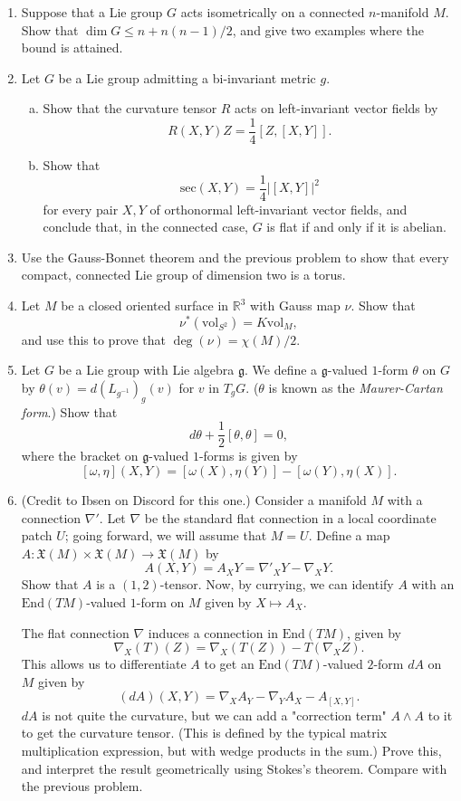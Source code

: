\documentclass[11pt]{article} %
\begin{document}
\begin{enumerate}
	\item Suppose that a Lie group $G$ acts isometrically on a connected $n$-manifold $M$. Show that $\dim G \leq n + n(n - 1)/2$, and give two examples where the bound is attained.

	\item Let $G$ be a Lie group admitting a bi-invariant metric $g$. 
	\begin{enumerate}[(a)]
		\item Show that the curvature tensor $R$ acts on left-invariant vector fields by 
		\[
			R(X, Y)Z = \frac{1}{4}[Z,[X,Y]].
		\]

		\item Show that 
		\[
			\mathrm{sec}(X, Y) = \frac{1}{4}\left|[X,Y]\right|^2
		\]
		for every pair $X,Y$ of orthonormal left-invariant vector fields, and conclude that, in the connected case, $G$ is flat if and only if it is abelian.
	\end{enumerate}
	
	\item Use the Gauss-Bonnet theorem and the previous problem to show that every compact, connected Lie group of dimension two is a torus.

	\item Let $M$ be a closed oriented surface in $\mathbb{R}^3$ with Gauss map $\nu$. Show that
	\[
		\nu^*(\mathrm{vol}_{S^2}) = K \mathrm{vol}_M, 
	\]
	and use this to prove that $\deg(\nu) = \chi(M)/2$.

	\item Let $G$ be a Lie group with Lie algebra $\mathfrak{g}$. We define a $\mathfrak{g}$-valued $1$-form $\theta$ on $G$ by $\theta(v) = d(L_{g^{-1}})_g(v)$ for $v$ in $T_gG$. ($\theta$ is known as the \emph{Maurer-Cartan form}.) Show that 
	\[
		d\theta + \frac{1}{2} [\theta, \theta] = 0,
	\]
	where the bracket on $\mathfrak{g}$-valued $1$-forms is given by 
	\[
			[\omega,\eta](X, Y) = [\omega(X),\eta(Y)] - [\omega(Y), \eta(X)].
	\]
	\item (Credit to Ibsen on Discord for this one.) Consider a manifold $M$ with a connection $\nabla'$. Let $\nabla$ be the standard flat connection in a local coordinate patch $U$; going forward, we will assume that $M = U$. Define a map $A\colon \mathfrak{X}(M) \times \mathfrak{X}(M) \to \mathfrak{X}(M)$ by 
	\[
		A(X, Y) = A_XY = \nabla'_XY - \nabla_XY.
	\]
	Show that $A$ is a $(1, 2)$-tensor. Now, by currying, we can identify $A$ with an $\mathrm{End}(TM)$-valued $1$-form on $M$ given by $X \mapsto A_X$.

	The flat connection $\nabla$ induces a connection in $\mathrm{End}(TM)$, given by 
	\[
		\nabla_X(T)(Z) = \nabla_X(T(Z)) - T(\nabla_X Z).
	\]
	This allows us to differentiate $A$ to get an $\mathrm{End}(TM)$-valued $2$-form $dA$ on $M$ given by 
	\[
		(dA)(X, Y) = \nabla_X A_Y - \nabla_Y A_X - A_{[X, Y]}.
	\]
	$dA$ is not quite the curvature, but we can add a "correction term" $A \wedge A$ to it to get the curvature tensor. (This is defined by the typical matrix multiplication expression, but with wedge products in the sum.) Prove this, and interpret the result geometrically using Stokes's theorem. Compare with the previous problem.


\end{enumerate}
\end{document}
